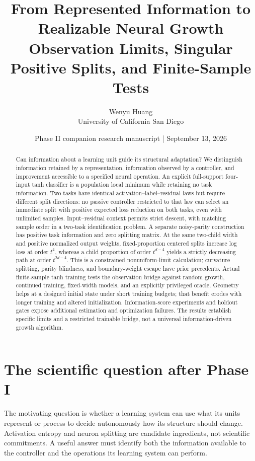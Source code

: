 \documentclass[11pt]{article}
\title{From Represented Information to Realizable Neural Growth\\[5pt]
\large Observation Limits, Singular Positive Splits, and Finite-Sample Tests}
\author{Wenyu Huang\\University of California San Diego}
\date{Phase II companion research manuscript \;|\; September 13, 2026}
\theoremstyle{remark}\newtheorem{remark}[theorem]{Remark}
\begin{document}
\maketitle
\begin{abstract}
Can information about a learning unit guide its structural adaptation?
We distinguish information retained by a representation, information observed
by a controller, and improvement accessible to a specified neural operation.
An explicit full-support four-input tanh classifier is a population local
minimum while retaining no task information. Two tasks have identical
activation--label--residual laws but require different split directions:
no passive controller restricted to that law can select an immediate split
with positive expected loss reduction on both tasks, even with unlimited
samples. Input--residual context permits strict descent, with
matching sample order in a two-task identification problem. A separate
noisy-parity construction has positive task information and zero splitting
matrix. At the same two-child width and positive normalized output weights,
fixed-proportion centered splits increase log loss at order $t^4$, whereas
a child proportion of order $t^{d-4}$ yields a strictly decreasing path at
order $t^{2d-4}$. This is a constrained nonuniform-limit calculation; curvature
splitting, parity blindness, and boundary-weight escape have prior precedents.
Actual finite-sample tanh training tests the observation bridge against
random growth, continued training, fixed-width models, and an explicitly
privileged oracle. Geometry helps at a designed initial state under short
training budgets; that benefit erodes with longer training and altered
initialization. Information-score experiments and holdout gates expose
additional estimation and optimization failures. The results establish
specific limits and a restricted trainable bridge, not a universal
information-driven growth algorithm.
\end{abstract}
\tableofcontents

\section{The scientific question after Phase I}
The motivating question is whether a learning system can use what its units
represent or process to decide autonomously how its structure should change.
Activation entropy and neuron splitting are candidate ingredients, not
scientific commitments. A useful answer must identify both the information
available to the controller and the operations its learning system can perform.
\end{document}
